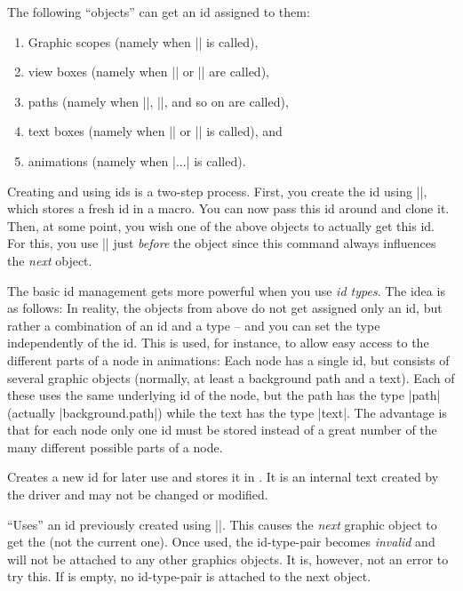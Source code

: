 The following ``objects'' can get an id assigned to them:
\begin{enumerate}
\item Graphic scopes (namely when |\pgfsys@begin@idscope| is called),
\item view boxes (namely when |\pgfsys@viewboxmeet| or |\pgfsys@viewboxslice| are called),
\item paths (namely when |\pgfsys@fill|, |\pgfsys@stroke|, and so on are called),
\item text boxes (namely when |\pgfsys@hbox| or |\pgfsys@hboxsynced| is called), and
\item animations (namely when |\pgfsys@animate...| is called).
\end{enumerate}


Creating and using ids is a two-step process. First, you create the
id using |\pgfsys@new@id|, which stores a fresh id in a macro. You can
now pass this id around and clone it. Then, at some point, you wish
one of the above objects to actually get this id. For this, you use
|\pgfsys@use@id| just \emph{before} the object since this command
always influences the \emph{next} object.

The basic id management gets more powerful when you use \emph{id
  types}. The idea is as follows: In reality, the objects from above
do not get assigned only an id, but rather a combination of an id and
a type -- and you can set the type independently of the id. This is
used, for instance, to allow easy access to the different parts of a
node in animations: Each node has a single id, but consists of several
graphic objects (normally, at least a background path and a
text). Each of these uses the same underlying id of the node, but the
path has the type |path| (actually |background.path|) while the text
has the type |text|. The advantage is that for each node only one id
must be stored instead of a great number of the many different
possible parts of a node.

\begin{command}{\pgfsys@new@id{}}
  Creates a new id for later use and stores it in . It is
  an internal text created by the driver and may not be changed or
  modified. 
\end{command}

\begin{command}{\pgfsys@use@id{}}
  ``Uses'' an id previously created using |\pgfsys@new@id|. This
  causes the \emph{next} graphic object to get the  (not the
  current one). Once used, the id-type-pair becomes \emph{invalid} and
  will not be attached to any other graphics objects. It is, however,
  not an error to try this. If  is empty, no id-type-pair is
  attached to the next object.
\end{command}

